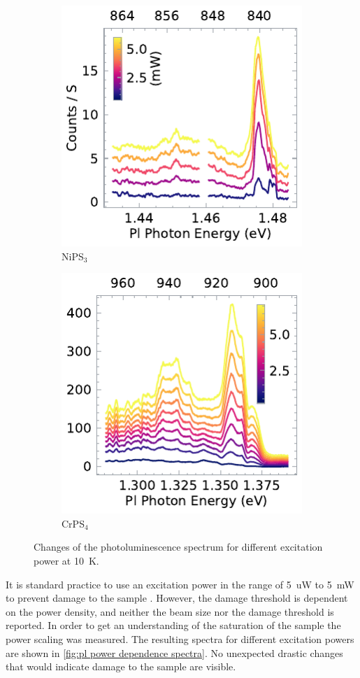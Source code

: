 \documentclass[
	twoside,
	parskip=half,
	a4paper,
]{scrbook}
\begin{document}
\begin{figure}
	\centering
	\begin{subfigure}{2.5in}
		\includegraphics{../figures/2024-04-06 NiPS3 excitation power dependence.pdf}
		\caption{NiPS$_3$}
	\end{subfigure}
	\begin{subfigure}{2.5in}
		\includegraphics{../figures/2023-12-14 CrPS4 excitation power dependence.pdf}
		\caption{CrPS$_4$}
	\end{subfigure}
	\caption{Changes of the photoluminescence spectrum for different excitation power at \SI{10}{K}.}
	\label{fig:pl power dependence spectra}
\end{figure}
It is standard practice to use an excitation power in the range of \SI{5}{uW} to \SI{5}{mW} to prevent damage to the sample \cite{NiPS3_anisotropic, NiPS3_exciton}.
However, the damage threshold is dependent on the power density, and neither the beam size nor the damage threshold is reported.
In order to get an understanding of the saturation of the sample the power scaling was measured.
The resulting spectra for different excitation powers are shown in \autoref{fig:pl power dependence spectra}.
No unexpected drastic changes that would indicate damage to the sample are visible.
\end{document}
